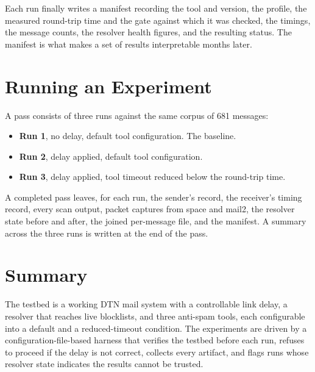 Each run finally writes a manifest recording the tool and version, the profile, the measured round-trip time and the gate against which it was checked, the timings, the message counts, the resolver health figures, and the resulting status. The manifest is what makes a set of results interpretable months later.

\section{Running an Experiment}

A pass consists of three runs against the same corpus of 681 messages:

\begin{itemize}
  \item \textbf{Run 1}, no delay, default tool configuration. The baseline.
  \item \textbf{Run 2}, delay applied, default tool configuration.
  \item \textbf{Run 3}, delay applied, tool timeout reduced below the round-trip
  time.
\end{itemize}

A completed pass leaves, for each run, the sender's record, the receiver's timing
record, every scan output, packet captures from space and mail2, the resolver state
before and after, the joined per-message file, and the manifest. A summary across the
three runs is written at the end of the pass.

\section{Summary}

The testbed is a working DTN mail system with a controllable link delay, a resolver that reaches live blocklists, and three anti-spam tools, each configurable into a default and a reduced-timeout condition. The experiments are driven by a configuration-file-based harness that verifies the testbed before each run, refuses to proceed if the delay is not correct, collects every artifact, and flags runs whose resolver state indicates the results cannot be trusted.